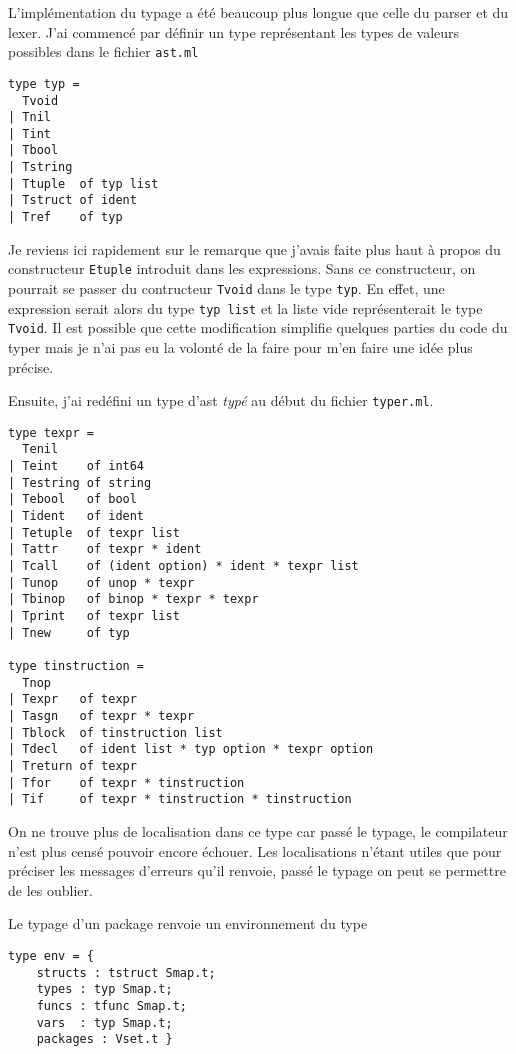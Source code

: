 \documentclass{article}
\begin{document}
L'implémentation du typage a été beaucoup plus longue que celle du parser et du lexer. J'ai commencé par définir un type représentant les types de valeurs possibles dans le fichier \texttt{ast.ml}

\begin{verbatim}
type typ =
  Tvoid
| Tnil
| Tint
| Tbool
| Tstring
| Ttuple  of typ list
| Tstruct of ident
| Tref    of typ
\end{verbatim}

Je reviens ici rapidement sur le remarque que j'avais faite plus haut à propos du constructeur \texttt{Etuple} introduit dans les expressions. Sans ce constructeur, on pourrait se passer du contructeur \texttt{Tvoid} dans le type \texttt{typ}. En effet, une expression serait alors du type \texttt{typ list} et la liste vide représenterait le type \texttt{Tvoid}. Il est possible que cette modification simplifie quelques parties du code du typer mais je n'ai pas eu la volonté de la faire pour m'en faire une idée plus précise.

Ensuite, j'ai redéfini un type d'ast \textit{typé} au début du fichier \texttt{typer.ml}.

\begin{verbatim}
type texpr =
  Tenil
| Teint    of int64
| Testring of string
| Tebool   of bool
| Tident   of ident
| Tetuple  of texpr list
| Tattr    of texpr * ident
| Tcall    of (ident option) * ident * texpr list
| Tunop    of unop * texpr
| Tbinop   of binop * texpr * texpr
| Tprint   of texpr list
| Tnew     of typ

type tinstruction =
  Tnop
| Texpr   of texpr
| Tasgn   of texpr * texpr
| Tblock  of tinstruction list
| Tdecl   of ident list * typ option * texpr option
| Treturn of texpr
| Tfor    of texpr * tinstruction
| Tif     of texpr * tinstruction * tinstruction
\end{verbatim}

On ne trouve plus de localisation dans ce type car passé le typage, le compilateur n'est plus censé pouvoir encore échouer. Les localisations n'étant utiles que pour préciser les messages d'erreurs qu'il renvoie, passé le typage on peut se permettre de les oublier.

Le typage d'un package renvoie un environnement du type

\begin{verbatim}
type env = {
    structs : tstruct Smap.t;
    types : typ Smap.t;
    funcs : tfunc Smap.t;
    vars  : typ Smap.t;
    packages : Vset.t }
\end{verbatim}
\end{document}
